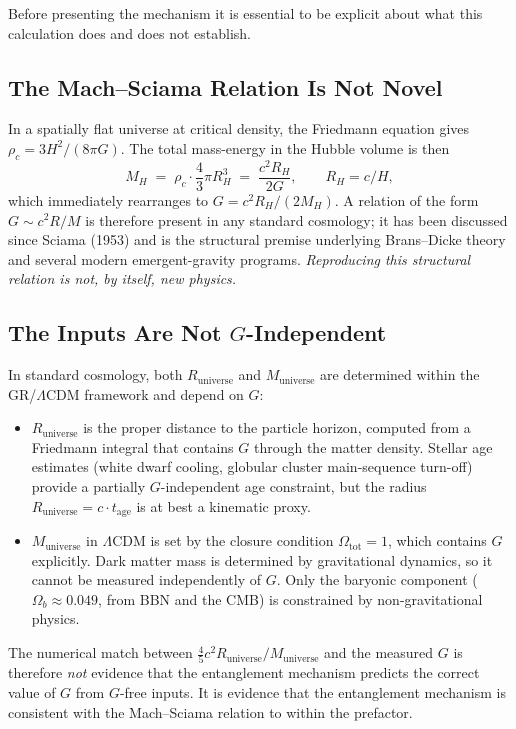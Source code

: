 \documentclass[11pt,letterpaper]{article}
\newcommand{\Runiv}{R_{\mathrm{universe}}}
\newcommand{\Muniv}{M_{\mathrm{universe}}}
\begin{document}
Before presenting the mechanism it is essential to be explicit about
what this calculation does and does not establish.

\subsection{The Mach--Sciama Relation Is Not Novel}

In a spatially flat universe at critical density, the Friedmann equation
gives $\rho_c = 3 H^2/(8\pi G)$. The total mass-energy in the Hubble
volume is then
\begin{equation}
  M_H \;=\; \rho_c \cdot \frac{4}{3}\pi R_H^3
       \;=\; \frac{c^2 R_H}{2 G},
       \qquad R_H = c/H,
\end{equation}
which immediately rearranges to $G = c^2 R_H/(2 M_H)$. A relation of the
form $G \sim c^2 R/M$ is therefore present in any standard cosmology;
it has been discussed since Sciama (1953) and is the structural premise
underlying Brans--Dicke theory and several modern emergent-gravity
programs. \emph{Reproducing this structural relation is not, by itself,
new physics.}

\subsection{The Inputs Are Not $G$-Independent}

In standard cosmology, both $\Runiv$ and $\Muniv$ are determined within
the GR/$\Lambda$CDM framework and depend on $G$:

\begin{itemize}
  \item $\Runiv$ is the proper distance to the particle horizon, computed
    from a Friedmann integral that contains $G$ through the matter
    density. Stellar age estimates (white dwarf cooling, globular cluster
    main-sequence turn-off) provide a partially $G$-independent age
    constraint, but the radius $\Runiv = c \cdot t_{\mathrm{age}}$ is at
    best a kinematic proxy.
  \item $\Muniv$ in $\Lambda$CDM is set by the closure condition
    $\Omega_{\mathrm{tot}} = 1$, which contains $G$ explicitly. Dark
    matter mass is determined by gravitational dynamics, so it cannot
    be measured independently of $G$. Only the baryonic component
    ($\Omega_b \approx 0.049$, from BBN and the CMB) is constrained
    by non-gravitational physics.
\end{itemize}

The numerical match between $\frac{4}{5} c^2 \Runiv/\Muniv$ and the
measured $G$ is therefore \emph{not} evidence that the entanglement
mechanism predicts the correct value of $G$ from $G$-free inputs. It
is evidence that the entanglement mechanism is consistent with the
Mach--Sciama relation to within the prefactor.
\end{document}
